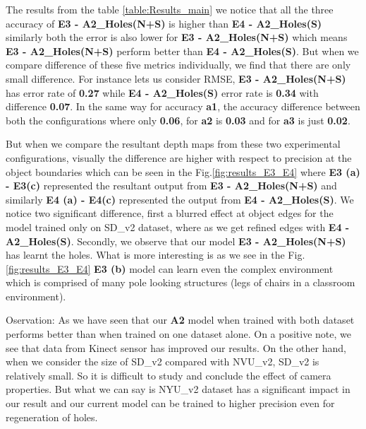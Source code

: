 The results from the table \ref{table:Results_main} we notice that all the three accuracy of \textbf{E3 - A2\_Holes(N+S)} is higher than \textbf{E4 - A2\_Holes(S)} similarly both the error is also lower for \textbf{E3 - A2\_Holes(N+S)} which means \textbf{E3 - A2\_Holes(N+S)} perform better than  \textbf{E4 - A2\_Holes(S)}. But when we compare difference of these five metrics individually, we find that there are only small difference. For instance lets us consider RMSE, \textbf{E3 - A2\_Holes(N+S)} has error rate of \textbf{0.27} while \textbf{E4 - A2\_Holes(S)} error rate is \textbf{0.34} with difference \textbf{0.07}. In the same way for accuracy \textbf{a1}, the accuracy difference between both the configurations where only \textbf{0.06}, for \textbf{a2} is \textbf{0.03} and for \textbf{a3} is just \textbf{0.02}. 

But when we compare the resultant depth maps from these two experimental configurations, visually the difference are higher with respect to precision at the object boundaries which can be seen in the Fig.\ref{fig:results_E3_E4}  where \textbf{E3 (a) - E3(c)} represented the resultant output from \textbf{E3 - A2\_Holes(N+S)} and similarly  \textbf{E4 (a) - E4(c)} represented the output from \textbf{E4 - A2\_Holes(S)}. We notice two significant difference, first a blurred effect at object edges for the model trained only on SD\_v2 dataset, where as we get refined edges with \textbf{E4 - A2\_Holes(S)}. Secondly, we observe that our model \textbf{E3 - A2\_Holes(N+S)} has learnt the holes. What is more interesting is as we see in the Fig. \ref{fig:results_E3_E4} \textbf{E3 (b)} model can learn even the complex environment which is comprised of many pole looking structures (legs of chairs in a classroom environment).

Oservation: As we have seen that our \textbf{A2} model when trained with both dataset performs better than when trained on one dataset alone. On a positive note, we see that data from Kinect sensor has improved our results. On the other hand, when we consider the size of SD\_v2 compared with NVU\_v2, SD\_v2 is relatively small. So it is difficult to study and conclude the effect of camera properties. But what we can say is NYU\_v2 dataset has a significant impact in our result and our current model can be trained to higher precision even for regeneration of holes.



